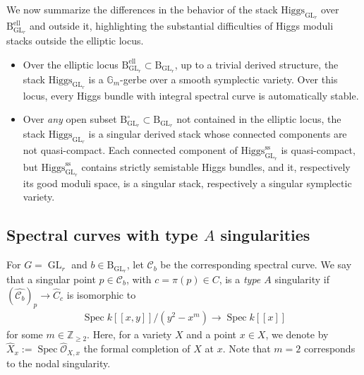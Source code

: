\documentclass[11pt,oneside,a4paper,mathscr]{amsart}
\theoremstyle{definition}
\renewcommand{\geq}{\geqslant}
\newcommand{\cC}{\mathcal{C}}
\newcommand{\cO}{\mathcal{O}}
\newcommand{\rB}{\mathrm{B}}
\newcommand{\Spec}{\operatorname{Spec}}
\newcommand{\GL}{\operatorname{GL}}
\newcommand{\Hig}{\mathrm{Higgs}}
\begin{document}
We now summarize the differences in the behavior of the stack $\Hig_{\GL_r}$ over 
$\rB_{\GL_r}^{\mathrm{ell}}$ and outside it, highlighting the substantial difficulties of Higgs moduli stacks outside the elliptic locus. 
\begin{itemize}[leftmargin=1.5em]
    \item Over the elliptic locus $\rB_{\GL_r}^{\mathrm{ell}} \subset \rB_{\GL_r}$,
    up to a trivial derived structure, the stack $\Hig_{\GL_r}$ is a $\mathbb{G}_m$-gerbe over a smooth symplectic variety. Over this locus, every Higgs bundle with integral spectral curve is automatically stable. 
    \item Over \textit{any} open subset $\rB_{\GL_r}^{\circ} \subset \rB_{\GL_r}$ not contained in the elliptic locus, the stack $\Hig_{\GL_r}$ is a singular derived stack whose connected components are not quasi-compact. 
    Each connected component of $\Hig_{\GL_r}^{\mathrm{ss}}$ is quasi-compact, but $\Hig_{\GL_r}^{\mathrm{ss}}$ contains strictly semistable Higgs bundles, and it, respectively its good moduli space, is a singular stack, respectively a singular symplectic variety. 
\end{itemize}




\subsection[Spectral curves with type A singularities]{Spectral curves with type \texorpdfstring{$A$}{A} singularities}
For $G=\GL_r$ and $b\in \rB_{\GL_r}$, let $\cC_b$ be the corresponding spectral 
curve. We say that a singular point $p\in \cC_b$, with $c=\pi(p) \in C$, 
is a \textit{type $A$} singularity if 
$(\widehat{\cC_b})_{p} \to \widehat{C}_c$
is isomorphic to 
\begin{align*}
    \Spec k[[x, y]]/(y^2-x^m) \to \Spec k[[x]]
\end{align*}
for some $m\in \mathbb{Z}_{\geq 2}$. 
Here, for a variety $X$ and a point $x\in X$, we denote by
$\widehat{X}_x:=\Spec \widehat{\cO}_{X, x}$ the formal completion of $X$ at $x$.
Note that $m=2$ corresponds to the nodal singularity. 
\end{document}
